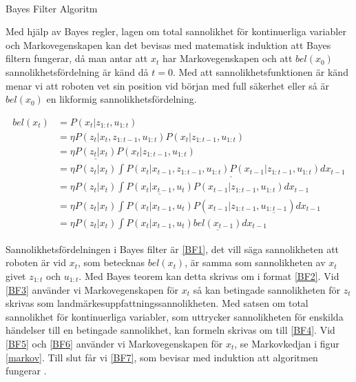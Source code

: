 \begin{algorithm}[H]
    \SetAlgoLined
    \label{BFA}
     \\
    \caption{Bayes Filter Algoritm}
\end{algorithm}

Med hjälp av Bayes regler, lagen om total sannolikhet för kontinuerliga variabler och Markovegenskapen kan det bevisas med matematisk induktion att Bayes filtern fungerar, då man antar att $x_t$ har Markovegenskapen och att $bel(x_0)$ sannolikhetsfördelning är känd då $t = 0$. Med att sannolikhetsfunktionen är känd menar vi att roboten vet sin position vid början med full säkerhet eller så är $bel(x_0)$ en likformig sannolikhetsfördelning.

\begin{align}
bel(x_t) & = P(x_t | z_{1:t}, u_{1:t}) \tag{BF1}\label{BF1} \\
        & = \eta P(z_t | x_t, z_{1:t-1}, u_{1:t}) P(x_t | z_{1:t-1}, u_{1:t}) \tag{BF2}\label{BF2}\\
        & = \eta \underline{P(z_t | x_t)} P(x_t | z_{1:t-1}, u_{1:t}) \tag{BF3}\label{BF3}\\
        & = \eta P(z_t | x_t) \underline{\int P(x_t | x_{t-1}, z_{1:t-1}, u_{1:t}) P(x_{t-1} | z_{1:t-1}, u_{1:t}) dx_{t-1}} \tag{BF4}\label{BF4}\\
        & = \eta P(z_t | x_t) \int \underline{P(x_t | x_{t-1}, u_t)} P(x_{t-1} | z_{1:t-1}, u_{1:t}) dx_{t-1} \tag{BF5}\label{BF5}\\
        & = \eta P(z_t | x_t) \int P(x_t | x_{t-1}, u_t) P(x_{t-1} | z_{1:t-1}, \underline{u_{1:t-1}}) dx_{t-1} \tag{BF6}\label{BF6}\\
        & = \eta P(z_t | x_t) \int P(x_t | x_{t-1}, u_t) \underline{bel(x_{t-1})} dx_{t-1} \tag{BF7}\label{BF7}
\end{align}

Sannolikhetsfördelningen i Bayes filter är \ref{BF1}, det vill säga sannolikheten att roboten är vid $x_t$, som betecknas $bel(x_t)$, är samma som sannolikheten av $x_t$ givet $z_{1:t}$ och $u_{1:t}$. Med Bayes teorem kan detta skrivas om i format \ref{BF2}. Vid \ref{BF3} använder vi Markovegenskapen för $x_t$ så kan betingade sannolikheten för $z_t$ skrivas som landmärkesuppfattningssannolikheten. Med satsen om total sannolikhet för kontinuerliga variabler, som uttrycker sannolikheten för enskilda händelser till en betingade sannolikhet, kan formeln skrivas om till \ref{BF4}. Vid \ref{BF5} och \ref{BF6} använder vi Markovegenskapen för $x_t$, se Markovkedjan i figur \ref{markov}. Till slut får vi \ref{BF7}, som bevisar med induktion att algoritmen fungerar \citep{ProbabilisticRobotics}.

